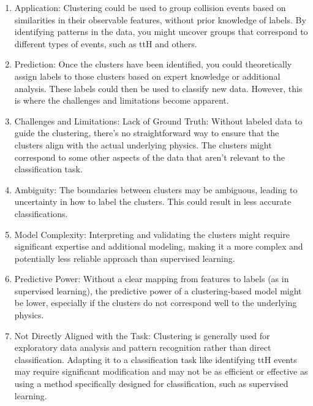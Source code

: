 \begin{enumerate}
      \item Application: Clustering could be used to group collision events based on similarities in their observable
            features, without prior knowledge of labels. By identifying patterns in the data, you might uncover groups
            that correspond to different types of events, such as ttH and others.

      \item Prediction: Once the clusters have been identified, you could theoretically assign labels to those clusters
            based on expert knowledge or additional analysis. These labels could then be used to classify new data.
            However, this is where the challenges and limitations become apparent.

      \item Challenges and Limitations: Lack of Ground Truth: Without labeled data to guide the clustering, there's no
            straightforward way to ensure that the clusters align with the actual underlying physics. The clusters might
            correspond to some other aspects of the data that aren't relevant to the classification task.

      \item Ambiguity: The boundaries between clusters may be ambiguous, leading to uncertainty in how to label the
            clusters. This could result in less accurate classifications.

      \item Model Complexity: Interpreting and validating the clusters might require significant expertise and additional
            modeling, making it a more complex and potentially less reliable approach than supervised learning.

      \item Predictive Power: Without a clear mapping from features to labels (as in supervised learning), the predictive
            power of a clustering-based model might be lower, especially if the clusters do not correspond well to the
            underlying physics.

      \item Not Directly Aligned with the Task: Clustering is generally used for exploratory data analysis and pattern
            recognition rather than direct classification. Adapting it to a classification task like identifying ttH
            events may require significant modification and may not be as efficient or effective as using a method
            specifically designed for classification, such as supervised learning.
\end{enumerate}
